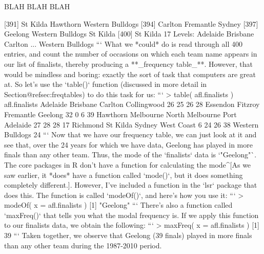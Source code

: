    BLAH BLAH BLAH

[391] St Kilda         Hawthorn         Western Bulldogs
[394] Carlton          Fremantle        Sydney          
[397] Geelong          Western Bulldogs St Kilda        
[400] St Kilda        
17 Levels: Adelaide Brisbane Carlton ... Western Bulldogs
```
What we *could* do is read through all 400 entries, and count the number of occasions on which each team name appears in our list of finalists, thereby producing a **_frequency table_**. However, that would be mindless and boring: exactly the sort of task that computers are great at. So let's use the `table()` function (discussed in more detail in Section@refsec:freqtables) to do this task for us:
```
> table( afl.finalists )
afl.finalists
        Adelaide         Brisbane          Carlton      Collingwood 
              26               25               26               28 
        Essendon          Fitzroy        Fremantle          Geelong 
              32                0                6               39 
        Hawthorn        Melbourne  North Melbourne    Port Adelaide 
              27               28               28               17 
        Richmond         St Kilda           Sydney       West Coast 
               6               24               26               38 
Western Bulldogs 
              24 
```
Now that we have our frequency table, we can just look at it and see that, over the 24 years for which we have data, Geelong has played in more finals than any other team. Thus, the mode of the `finalists` data is `"Geelong"`. The core packages in R don't have a function for calculating the mode^[As we saw earlier, it *does* have a function called `mode()`, but it does something completely different.]. However, I've included a function in the `lsr` package that does this. The function is called `modeOf()`, and here's how you use it:
```
> modeOf( x = afl.finalists )
[1] "Geelong"
```
There's also a function called `maxFreq()` that tells you what the modal frequency is. If we apply this function to our finalists data, we obtain the following:
```
> maxFreq( x = afl.finalists )
[1] 39
```
Taken together, we observe that Geelong (39 finals) played in more finals than any other team during the 1987-2010 period. 

